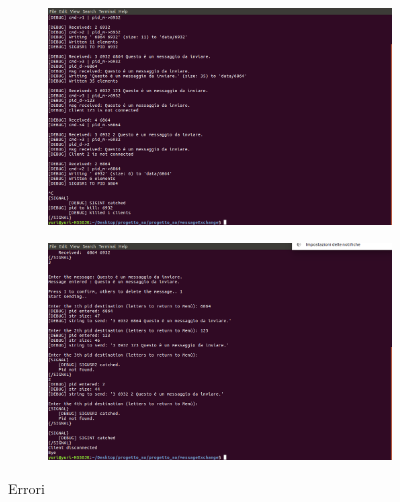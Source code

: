 \documentclass[a4paper]{article}
\begin{document}
\begin{figure}
\centering
\begin{subfigure}[b]{0.8\textwidth}
\includegraphics[width=\textwidth]{screenmsg/16_server}
\caption{}
\end{subfigure}
\begin{subfigure}[b]{0.8\textwidth}
\includegraphics[width=\textwidth]{screenmsg/17_client_6932}
\caption{}
\end{subfigure}
\caption{Errori}
\end{figure}
\end{document}
